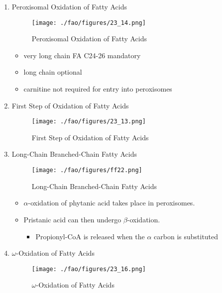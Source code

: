 \documentclass{scrartcl}
\begin{document}
\begin{enumerate}
\item Peroxisomal Oxidation of Fatty Acids
\label{sec:orge74c201}

\begin{figure}[htbp]
\centering
\texttt{[image: ./fao/figures/23\_14.png]}
\caption{\label{fig:org2a10ab2}
Peroxisomal Oxidation of Fatty Acids}
\end{figure}

\begin{itemize}
\item very long chain FA C24-26 mandatory
\item long chain optional
\item carnitine not required for entry into peroxisomes
\end{itemize}

\item First Step of Oxidation of Fatty Acids
\label{sec:orgef678cb}
\begin{figure}[htbp]
\centering
\texttt{[image: ./fao/figures/23\_13.png]}
\caption{\label{fig:org903a221}
First Step of Oxidation of Fatty Acids}
\end{figure}

\item Long-Chain Branched-Chain Fatty Acids
\label{sec:orgadd4725}

\begin{figure}[htbp]
\centering
\texttt{[image: ./fao/figures/ff22.png]}
\caption{\label{fig:org9e014fe}
Long-Chain Branched-Chain Fatty Acids}
\end{figure}

\begin{itemize}
\item \(\alpha\)-oxidation of phytanic acid takes place in peroxisomes.
\item Pristanic acid can then undergo \(\beta\)-oxidation.
\begin{itemize}
\item Propionyl-CoA is released when the \(\alpha\) carbon is substituted
\end{itemize}
\end{itemize}

\item \(\omega\)-Oxidation of Fatty Acids
\label{sec:org79c1cd5}

\begin{figure}[htbp]
\centering
\texttt{[image: ./fao/figures/23\_16.png]}
\caption{\label{fig:org45d996f}
\(\omega\)-Oxidation of Fatty Acids}
\end{figure}


\end{enumerate}
\end{document}
